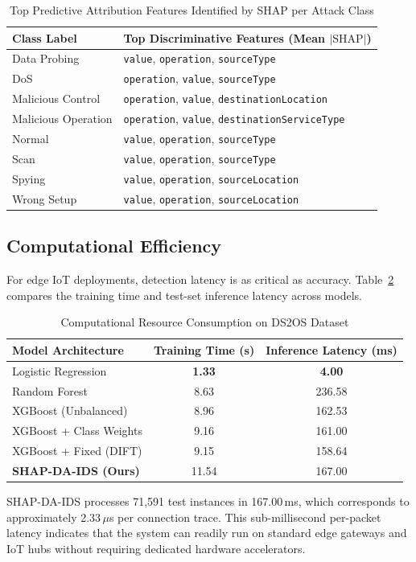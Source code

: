 \begin{table}[!t]
\centering
\caption{Top Predictive Attribution Features Identified by SHAP per Attack Class}
\label{tab:per_class_shap}
\begin{tabular}{|l|l|}
\hline
\textbf{Class Label} & \textbf{Top Discriminative Features (Mean $|\text{SHAP}|$)} \\ \hline
Data Probing & \texttt{value}, \texttt{operation}, \texttt{sourceType} \\ \hline
DoS & \texttt{operation}, \texttt{value}, \texttt{sourceType} \\ \hline
Malicious Control & \texttt{operation}, \texttt{value}, \texttt{destinationLocation} \\ \hline
Malicious Operation & \texttt{operation}, \texttt{value}, \texttt{destinationServiceType} \\ \hline
Normal & \texttt{value}, \texttt{operation}, \texttt{sourceType} \\ \hline
Scan & \texttt{value}, \texttt{operation}, \texttt{sourceType} \\ \hline
Spying & \texttt{value}, \texttt{operation}, \texttt{sourceLocation} \\ \hline
Wrong Setup & \texttt{value}, \texttt{operation}, \texttt{sourceLocation} \\ \hline
\end{tabular}
\end{table}

\subsection{Computational Efficiency}
For edge IoT deployments, detection latency is as critical as accuracy. Table~\ref{tab:timing} compares the training time and test-set inference latency across models.

\begin{table}[!t]
\centering
\caption{Computational Resource Consumption on DS2OS Dataset}
\label{tab:timing}
\begin{tabular}{|l|c|c|}
\hline
\textbf{Model Architecture} & \textbf{Training Time (s)} & \textbf{Inference Latency (ms)} \\ \hline
Logistic Regression & \textbf{1.33} & \textbf{4.00} \\ \hline
Random Forest & 8.63 & 236.58 \\ \hline
XGBoost (Unbalanced) & 8.96 & 162.53 \\ \hline
XGBoost + Class Weights & 9.16 & 161.00 \\ \hline
XGBoost + Fixed (DIFT) & 9.15 & 158.64 \\ \hline
\textbf{SHAP-DA-IDS (Ours)} & 11.54 & 167.00 \\ \hline
\end{tabular}
\end{table}

SHAP-DA-IDS processes 71,591 test instances in 167.00\,ms, which corresponds to approximately 2.33\,$\mu$s per connection trace. This sub-millisecond per-packet latency indicates that the system can readily run on standard edge gateways and IoT hubs without requiring dedicated hardware accelerators.
